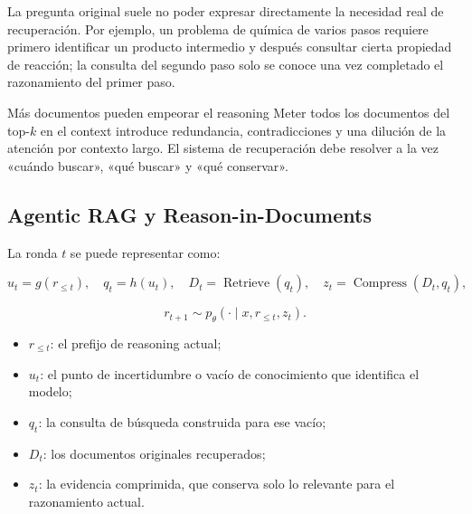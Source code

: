 La pregunta original suele no poder expresar directamente la necesidad real de recuperación. Por ejemplo, un problema de química de varios pasos requiere primero identificar un producto intermedio y después consultar cierta propiedad de reacción; la consulta del segundo paso solo se conoce una vez completado el razonamiento del primer paso.

\begin{warningbox}{Más documentos pueden empeorar el reasoning}
Meter todos los documentos del top-$k$ en el context introduce redundancia, contradicciones y una dilución de la atención por contexto largo. El sistema de recuperación debe resolver a la vez «cuándo buscar», «qué buscar» y «qué conservar».
\end{warningbox}

\subsection{Agentic RAG y Reason-in-Documents}


La ronda $t$ se puede representar como:

$$
u_t=g(r_{\le t}),\quad
q_t=h(u_t),\quad
D_t=\operatorname{Retrieve}(q_t),\quad
z_t=\operatorname{Compress}(D_t,q_t),
$$

$$
r_{t+1}\sim p_\theta(\cdot\mid x,r_{\le t},z_t).
$$

\begin{itemize}
    \item $r_{\le t}$: el prefijo de reasoning actual;
    \item $u_t$: el punto de incertidumbre o vacío de conocimiento que identifica el modelo;
    \item $q_t$: la consulta de búsqueda construida para ese vacío;
    \item $D_t$: los documentos originales recuperados;
    \item $z_t$: la evidencia comprimida, que conserva solo lo relevante para el razonamiento actual.
\end{itemize}


